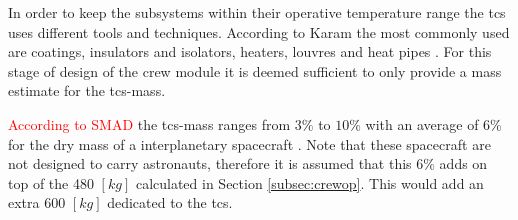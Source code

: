 In order to keep the subsystems within their operative temperature range the \gls{tcs} uses different tools and techniques. According to Karam the most commonly used are coatings, insulators and isolators, heaters, louvres and heat pipes \cite{Karam1998}. For this stage of design of the crew module it is deemed sufficient to only provide a mass estimate for the \gls{tcs}-mass.

\textcolor{red}{According to SMAD} the \gls{tcs}-mass ranges from $3\%$ to $10\%$ with an average of 6\% for the dry mass of a interplanetary spacecraft \cite{Wertz2011}. Note that these spacecraft are not designed to carry astronauts, therefore it is assumed that this $6\%$ adds on top of the 480 $[kg]$ calculated in Section \ref{subsec:crewop}. This would add an extra 600 $[kg]$ dedicated to the \gls{tcs}.

